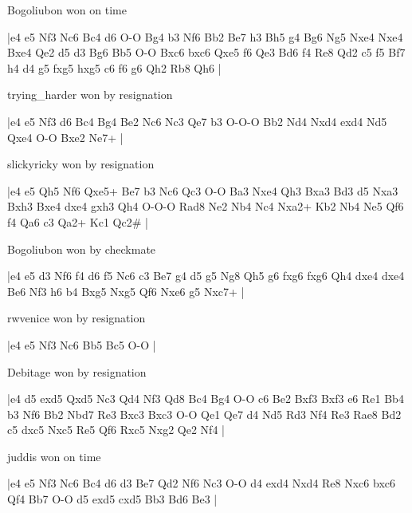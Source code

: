 \showboard

Bogoliubon won on time

\makegametitle
|e4 e5 Nf3 Nc6 Bc4 d6 O-O Bg4 b3 Nf6 Bb2 Be7 h3 Bh5 g4 Bg6 Ng5 Nxe4 Nxe4 Bxe4 Qe2 d5 d3 Bg6 Bb5 O-O Bxc6 bxc6 Qxe5 f6 Qe3 Bd6 f4 Re8 Qd2 c5 f5 Bf7 h4 d4 g5 fxg5 hxg5 c6 f6 g6 Qh2 Rb8 Qh6  |

\showboard

trying\_harder won by resignation

\makegametitle
|e4 e5 Nf3 d6 Bc4 Bg4 Be2 Nc6 Nc3 Qe7 b3 O-O-O Bb2 Nd4 Nxd4 exd4 Nd5 Qxe4 O-O Bxe2 Ne7+  |

\showboard

slickyricky won by resignation

\makegametitle
|e4 e5 Qh5 Nf6 Qxe5+ Be7 b3 Nc6 Qc3 O-O Ba3 Nxe4 Qh3 Bxa3 Bd3 d5 Nxa3 Bxh3 Bxe4 dxe4 gxh3 Qh4 O-O-O Rad8 Ne2 Nb4 Nc4 Nxa2+ Kb2 Nb4 Ne5 Qf6 f4 Qa6 c3 Qa2+ Kc1 Qc2\#  |

\showboard

Bogoliubon won by checkmate

\makegametitle
|e4 e5 d3 Nf6 f4 d6 f5 Nc6 c3 Be7 g4 d5 g5 Ng8 Qh5 g6 fxg6 fxg6 Qh4 dxe4 dxe4 Be6 Nf3 h6 b4 Bxg5 Nxg5 Qf6 Nxe6 g5 Nxc7+  |

\showboard

rwvenice won by resignation

\makegametitle
|e4 e5 Nf3 Nc6 Bb5 Bc5 O-O  |

\showboard

Debitage won by resignation

\makegametitle
|e4 d5 exd5 Qxd5 Nc3 Qd4 Nf3 Qd8 Bc4 Bg4 O-O c6 Be2 Bxf3 Bxf3 e6 Re1 Bb4 b3 Nf6 Bb2 Nbd7 Re3 Bxc3 Bxc3 O-O Qe1 Qe7 d4 Nd5 Rd3 Nf4 Re3 Rae8 Bd2 c5 dxc5 Nxc5 Re5 Qf6 Rxc5 Nxg2 Qe2 Nf4  |

\showboard

juddis won on time

\makegametitle
|e4 e5 Nf3 Nc6 Bc4 d6 d3 Be7 Qd2 Nf6 Nc3 O-O d4 exd4 Nxd4 Re8 Nxc6 bxc6 Qf4 Bb7 O-O d5 exd5 cxd5 Bb3 Bd6 Be3  |

